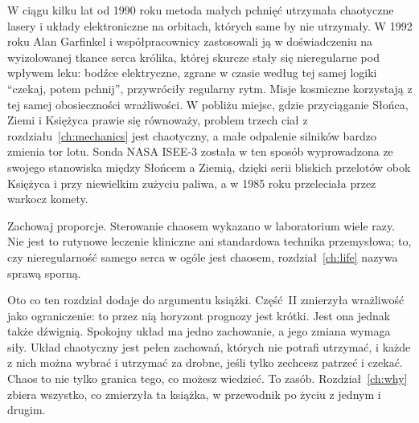 \begin{worldbox}
W ciągu kilku lat od 1990 roku metoda małych pchnięć utrzymała chaotyczne
lasery i układy elektroniczne na orbitach, których same by nie utrzymały. W
1992 roku Alan Garfinkel i współpracownicy zastosowali ją w doświadczeniu na
wyizolowanej tkance serca królika, której skurcze stały się nieregularne
pod wpływem leku: bodźce elektryczne, zgrane w czasie według tej samej
logiki \enquote{czekaj, potem pchnij}, przywróciły regularny rytm. Misje
kosmiczne korzystają z tej samej obosieczności wrażliwości. W pobliżu
miejsc, gdzie przyciąganie Słońca, Ziemi i Księżyca prawie się równoważy,
problem trzech ciał z rozdziału~\ref{ch:mechanics} jest chaotyczny, a małe
odpalenie silników bardzo zmienia tor lotu. Sonda NASA ISEE-3 została w ten
sposób wyprowadzona ze swojego stanowiska między Słońcem a Ziemią, dzięki
serii bliskich przelotów obok Księżyca i przy niewielkim zużyciu paliwa, a w
1985 roku przeleciała przez warkocz komety.
\end{worldbox}

\begin{warning}
Zachowaj proporcje. Sterowanie chaosem wykazano w laboratorium wiele razy.
Nie jest to rutynowe leczenie kliniczne ani standardowa technika
przemysłowa; to, czy nieregularność samego serca w ogóle jest chaosem,
rozdział~\ref{ch:life} nazywa sprawą sporną.
\end{warning}

\noindent
Oto co ten rozdział dodaje do argumentu książki. Część~II zmierzyła
wrażliwość jako ograniczenie: to przez nią horyzont prognozy jest krótki.
Jest ona jednak także dźwignią. Spokojny układ ma jedno zachowanie, a jego
zmiana wymaga siły. Układ chaotyczny jest pełen zachowań, których nie
potrafi utrzymać, i każde z nich można wybrać i utrzymać za drobne, jeśli
tylko zechcesz patrzeć i czekać. Chaos to nie tylko granica tego, co możesz
wiedzieć. To zasób. Rozdział~\ref{ch:why} zbiera wszystko, co zmierzyła ta
książka, w przewodnik po życiu z jednym i drugim.

